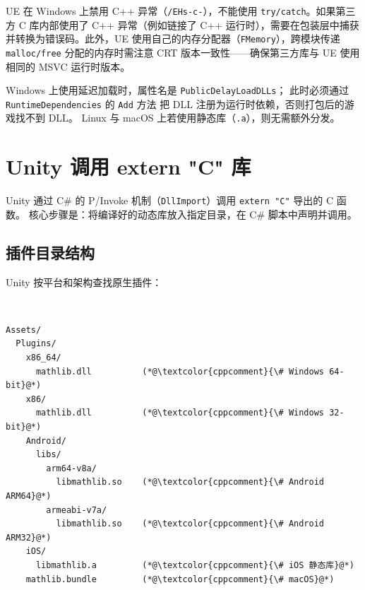 \documentclass[12pt,a4paper,fontset=fandol]{ctexbook}
\newcommand{\bashlabel}{%
  \begin{tcolorbox}[enhanced,colback=black!80,colframe=black!80,
    arc=1mm,boxrule=0mm,left=6pt,right=6pt,top=2pt,bottom=2pt,
    halign=left,oversize]
    \textcolor{white}{\small\bfseries Shell}
  \end{tcolorbox}\vspace{-4pt}}
\newcommand{\cpp}[1]{C++#1}
\newcommand{\Tp}[1]{\texttt{#1}}
\begin{document}
\begin{tcolorbox}[warning={UE 的异常与 CRT 限制}]
UE 在 Windows 上禁用 \cpp{} 异常（\texttt{/EHs-c-}），不能使用 \texttt{try/catch}。如果第三方 C 库内部使用了 \cpp{} 异常（例如链接了 \cpp{} 运行时），需要在包装层中捕获并转换为错误码。此外，UE 使用自己的内存分配器（\texttt{FMemory}），跨模块传递 \texttt{malloc/free} 分配的内存时需注意 CRT 版本一致性——确保第三方库与 UE 使用相同的 MSVC 运行时版本。
\end{tcolorbox}

\begin{tcolorbox}[note={打包分发}]
Windows 上使用延迟加载时，属性名是 \texttt{Public\allowbreak{}Delay\allowbreak{}LoadDLLs}；
此时必须通过 \texttt{Runtime\allowbreak{}Dependencies} 的 \texttt{Add} 方法
把 DLL 注册为运行时依赖，否则打包后的游戏找不到 DLL。
Linux 与 macOS 上若使用静态库（\texttt{.a}），则无需额外分发。
\end{tcolorbox}

\section{Unity 调用 extern "C" 库}

Unity 通过 C\# 的 P/Invoke 机制（\Tp{DllImport}）调用 \texttt{extern "C"} 导出的 C 函数。
核心步骤是：将编译好的动态库放入指定目录，在 C\# 脚本中声明并调用。

\subsection{插件目录结构}

Unity 按平台和架构查找原生插件：

\bashlabel
\begin{lstlisting}[style=bashstyle]
Assets/
  Plugins/
    x86_64/
      mathlib.dll          (*@\textcolor{cppcomment}{\# Windows 64-bit}@*)
    x86/
      mathlib.dll          (*@\textcolor{cppcomment}{\# Windows 32-bit}@*)
    Android/
      libs/
        arm64-v8a/
          libmathlib.so    (*@\textcolor{cppcomment}{\# Android ARM64}@*)
        armeabi-v7a/
          libmathlib.so    (*@\textcolor{cppcomment}{\# Android ARM32}@*)
    iOS/
      libmathlib.a         (*@\textcolor{cppcomment}{\# iOS 静态库}@*)
    mathlib.bundle         (*@\textcolor{cppcomment}{\# macOS}@*)
\end{lstlisting}
\end{document}

